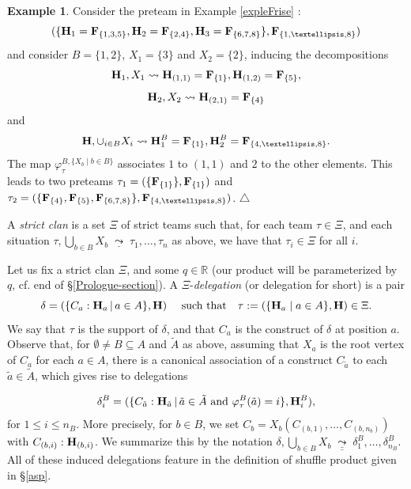 \documentclass[11pt]{article}
\theoremstyle{definition}
\newtheorem{example}[theo]{Example}
\numberwithin{equation}{section}
\numberwithin{equation}{section}
\newcommand{\uline}[1]{\underline{#1}}
\newcommand{\uuline}[1]{\underline{\underline{#1}}}
\newcommand\xqed[1]{%
  \leavevmode\unskip\penalty9999 \hbox{}\nobreak\hfill
  \quad\hbox{#1}}
\newcommand\demo{\xqed{$\triangle$}}
\newcommand{\set}[1]{\{#1\}}
\newcommand{\setc}[2]{\set{#1 \mid #2}}
\newcommand{\Union}{\bigcup}		%
\newcommand{\hyper}[1]{{\bf #1}}
\newcommand{\clandec}{\;\uline{\leadsto}\;}
\newcommand{\deldec}{\;\uuline{\leadsto}\;}
\begin{document}
 
\begin{example} 
\label{expleFrise2} Consider the preteam in Example \ref{expleFrise} :
$$(\{\hyper{H}_1=\hyper{F}_{\{1,3,5\}},\hyper{H}_2=\hyper{F}_{\{2,4\}}, \hyper{H}_3=\hyper{F}_{\{6,7,8\}}\}, \hyper{F}_{\{1,\ldots,8\}})$$
and consider $B=\{1,2\}$, $X_1=\{3\}$ and $X_2=\{2\}$, inducing the decompositions 
$$\hyper{H}_1, X_1 \leadsto \hyper{H}_{(1,1)}=\hyper{F}_{\{1\}}, \hyper{H}_{(1,2)}=\hyper{F}_{\{5\}},$$
 $$\hyper{H}_2, X_2 \leadsto \hyper{H}_{(2,1)}=\hyper{F}_{\{4\}}$$ 
 and $$\hyper{H}, \cup_{i \in B} X_i \leadsto \hyper{H}_1^B=\hyper{F}_{\{1\}}, \hyper{H}_2^B=\hyper{F}_{\{4, \ldots, 8\}}.$$ The map $\varphi^{B,\setc{X_b}{b\in B}}_{\tau}$ associates $1$ to $(1,1)$ and $2$ to the other elements. This leads to two preteams $\tau_1=(\{\hyper{F}_{\{1\}}\},\hyper{F}_{\{1\}})$ and $\tau_2=(\{ \hyper{F}_{\{4\}}, \hyper{F}_{\{5\}}, \hyper{F}_{\{6,7,8\}}\}, \hyper{F}_{\{4, \ldots, 8\}})$. \demo
\end{example} 
 

 
 A {\it  strict clan} is a set $\Xi$ of strict teams such that, for each team $\tau\in \Xi$, and each situation $\tau,\Union_{b\in B}X_b\clandec \tau_1,\ldots,\tau_n$ as above, we have that $\tau_i\in \Xi$ for all $i$.  

Let us fix a strict clan $\Xi$, and   some $q\in{\mathbb R}$ (our product will be parameterized by $q$, cf. end of \S\ref{Prologue-section}).
A  $\Xi$-{\it delegation} (or delegation for short) is  a pair 
$$\delta=(\{C_a:{\bf H}_a\,|\, a\in A\},{\bf H}) \quad\mbox{
such that}\quad \tau:=(\setc{\hyper{H}_a}{a\in A},\hyper{H})\in \Xi.$$
We say that $\tau$ is the support of $\delta$, and that $C_a$ is the construct of $\delta$ at position $a$. 
 Observe that, for  $\emptyset \neq B\subseteq A$ and $\tilde{A}$  as above, assuming that $X_a$ is the root vertex of $C_a$ for each $a\in A$, there is a canonical association of a construct $C_{\tilde{a}}$ to each $\tilde{a}\in \tilde{A}$, which gives rise to delegations 
 
 \begin{equation} \label{deltas}
 \delta^B_i=(\{C_{\tilde{a}}:{\bf H}_{\tilde{a}}\,|\, \tilde{a}\in \tilde{A} \mbox{ and }\varphi^B_\tau(\tilde{a})=i\},{\bf H}_i^B),\end{equation} 
 for $1\leq i\leq n_B$.  More precisely, for $b\in B$, we set $C_b=X_b(C_{(b,1)},\ldots,C_{(b,n_b)})$ with $C_{(b,i)}:\hyper{H}_{(b,i)}$. We summarize this by the notation $\delta,\Union_{b\in B} X_b\deldec \delta^B_1,\ldots,\delta^B_{n_B}$. 
All of these induced delegations feature in the definition of shuffle product given in \S\ref{asp}.
 
\end{document}
